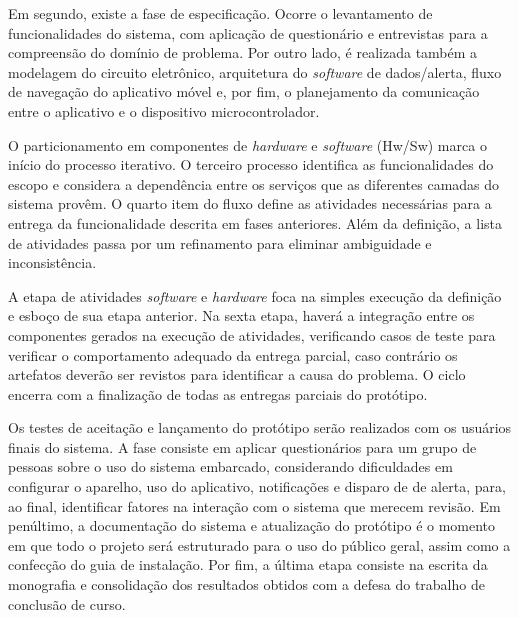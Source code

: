 Em segundo, existe a fase de especificação. Ocorre o levantamento de funcionalidades do sistema, com aplicação de questionário 
e entrevistas para a compreensão do domínio de problema. Por outro lado, é realizada também a modelagem do circuito 
eletrônico, arquitetura do \textit{software} de dados/alerta, fluxo de navegação do aplicativo móvel e, por fim, o 
planejamento da comunicação entre o aplicativo e o dispositivo microcontrolador.

O particionamento em componentes de \textit{hardware} e \textit{software} (Hw/Sw) marca o início do processo iterativo. O terceiro 
processo identifica as funcionalidades do escopo e considera a dependência entre os serviços que as diferentes camadas do sistema provêm. O quarto item 
do fluxo define as atividades necessárias para a entrega da funcionalidade descrita em fases anteriores. Além da definição, a lista de atividades passa 
por um refinamento para eliminar ambiguidade e inconsistência.

A etapa de atividades \textit{software} e \textit{hardware} foca na simples execução da definição e esboço de sua etapa anterior. Na sexta etapa, haverá a integração 
entre os componentes gerados na execução de atividades, verificando casos de teste para verificar o comportamento adequado da entrega parcial, caso contrário os artefatos 
deverão ser revistos para identificar a causa do problema. O ciclo encerra com a finalização de todas as entregas parciais do protótipo.

Os testes de aceitação e lançamento do protótipo serão realizados com os usuários finais do sistema. A fase consiste em aplicar questionários para um grupo de pessoas sobre o uso 
do sistema embarcado, considerando dificuldades em configurar o aparelho, uso do aplicativo, notificações e disparo de de alerta, para, ao final, identificar fatores na interação com o sistema que 
merecem revisão. Em penúltimo, a documentação do sistema e atualização do protótipo é o momento em que todo o projeto será estruturado para o uso do público geral, assim como a confecção do guia 
de instalação. Por fim, a última etapa consiste na escrita da monografia e consolidação dos resultados obtidos com a defesa do trabalho de conclusão de curso.